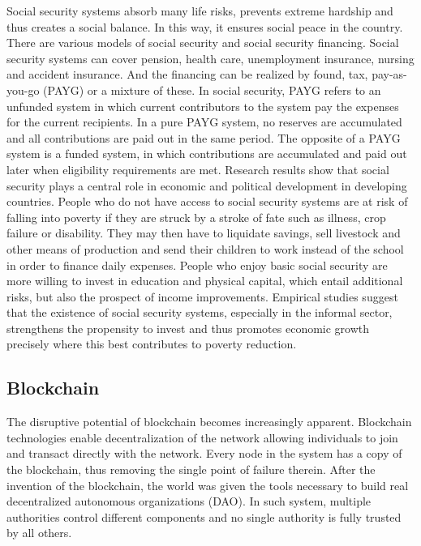 Social security systems absorb many life risks, prevents extreme hardship and thus creates a social balance. In this way, it ensures social peace in the country.
\newline
There are various models of social security and social security financing. Social security systems can cover pension, health care, unemployment insurance, nursing and accident insurance. And the financing can be realized by found, tax, pay-as-you-go (PAYG) or a mixture of these.
In social security, PAYG refers to an unfunded system in which current contributors to the system pay the expenses for the current recipients. In a pure PAYG system, no reserves are accumulated and all contributions are paid out in the same period. The opposite of a PAYG system is a funded system, in which contributions are accumulated and paid out later when eligibility requirements are met.
\newline
Research results show that social security plays a central role in economic and political development in developing countries. People who do not have access to social security systems are at risk of falling into poverty if they are struck by a stroke of fate such as illness, crop failure or disability. They may then have to liquidate savings, sell livestock and other means of production and send their children to work instead of the school in order to finance daily expenses. \cite{erd}
\newline
People who enjoy basic social security are more willing to invest in education and physical capital, which entail additional risks, but also the prospect of income improvements. Empirical studies suggest that the existence of social security systems, especially in the informal sector, strengthens the propensity to invest and thus promotes economic growth precisely where this best contributes to poverty reduction. \cite{hcms}

\subsection{Blockchain}

The disruptive potential of blockchain becomes increasingly apparent. Blockchain technologies enable decentralization of the network allowing individuals to join and transact directly with the network. Every node in the system has a copy of the blockchain, thus removing the single point of failure therein. After the invention of the blockchain, the world was given the tools necessary to build real decentralized autonomous organizations (DAO). In such system, multiple authorities control different components and no single authority is fully trusted by all others. \cite{cammarden}
\newline

